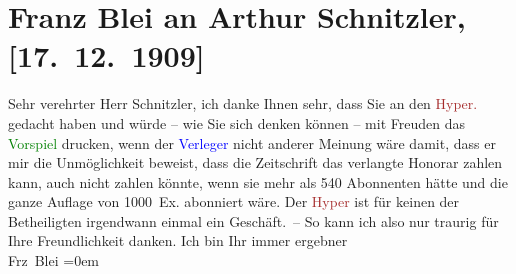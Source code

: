 

               \section[Franz Blei an Arthur Schnitzler, {[}17. 12. 1909{]}]{ Franz Blei an Arthur Schnitzler, {[}17. 12. 1909{]}}\nopagebreak{}\rehead{ }\normalsize\beginnumbering{} \toendnotes[C]{\smallbreak\pagebreak[2]} 
\toendnotes[C]{\smallbreak}\pstart{}{\pb}Sehr verehrter Herr
                        Schnitzler,\pend\pstart
           ich danke Ihnen sehr, dass Sie an den \textcolor{brown}{Hyper.}{}\ledrightnote{\textcolor{brown}{Hyperion}}
                    gedacht haben und würde – wie Sie sich denken können – mit Freuden das \textcolor{green}{Vorspiel}{} drucken, wenn der
                        \textcolor{blue}{Verleger}{} nicht anderer
                    Meinung wäre damit, dass er mir die Unmöglichkeit beweist, dass die Zeitschrift
                    das verlangte Honorar zahlen kann, auch nicht zahlen könnte, wenn sie mehr als
                    540 Abonnenten hätte und die ganze Auflage von 1000 Ex. abonniert wäre. Der \textcolor{brown}{Hyper}{}\ledrightnote{\textcolor{brown}{Hyperion}} ist für keinen der Betheiligten
                    irgendwann einmal ein Geschäft. – So kann ich also nur traurig für Ihre
                    Freundlichkeit danken.\pend
           \pstart
           Ich bin Ihr immer ergebner{\\[\baselineskip]}\spacefill\mbox{Frz Blei}\pend
           \leftskip=0em{}\endnumbering{}  
      